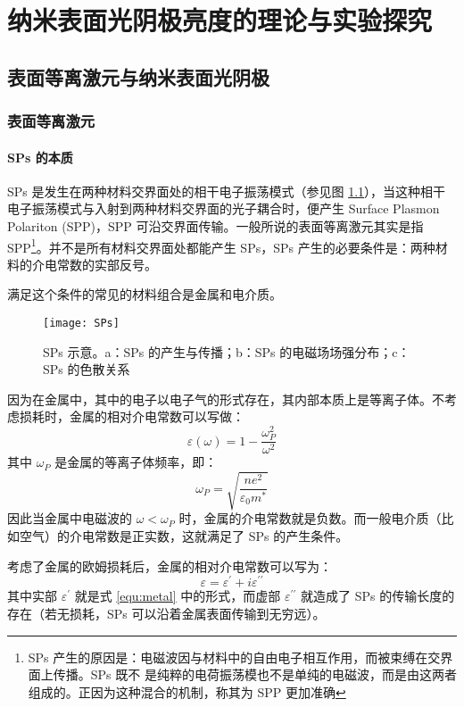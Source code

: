 \chapter{纳米表面光阴极亮度的理论与实验探究}
\label{chap:NPC}

\section{表面等离激元与纳米表面光阴极}
\subsection{表面等离激元}
\subsubsection{SPs 的本质}
SPs 是发生在两种材料交界面处的相干电子振荡模式（参见图 \ref{fig:SPs}），当这种相干电子振荡模式与入射到两种材料交界面的光子耦合时，便产生 Surface Plasmon Polariton (SPP)，SPP 可沿交界面传输。一般所说的表面等离激元其实是指 SPP\footnote{SPs 产生的原因是：电磁波因与材料中的自由电子相互作用，而被束缚在交界面上传播。SPs 既不 是纯粹的电荷振荡模也不是单纯的电磁波，而是由这两者组成的。正因为这种混合的机制，称其为 SPP 更加准确}。并不是所有材料交界面处都能产生 SPs，SPs 产生的必要条件是：两种材料的介电常数的实部反号。

满足这个条件的常见的材料组合是金属和电介质。

\begin{figure}[htbp]
\centering
\texttt{[image: SPs]}
\caption{\label{fig:SPs} SPs 示意。a：SPs 的产生与传播；b：SPs 的电磁场场强分布；c：SPs 的色散关系}
\end{figure}
	
因为在金属中，其中的电子以电子气的形式存在，其内部本质上是等离子体。不考虑损耗时，金属的相对介电常数可以写做：
\begin{equation}
\varepsilon(\omega) = 1-\dfrac{\omega_P^2}{\omega^2}
\label{equ:metal}
\end{equation}
其中 $\omega_P$ 是金属的等离子体频率，即：
\[
	\omega_P = \sqrt{\dfrac{ne^2}{\varepsilon_0m^*}}
\]
因此当金属中电磁波的 $\omega<\omega_P$ 时，金属的介电常数就是负数。而一般电介质（比如空气）的介电常数是正实数，这就满足了 SPs 的产生条件。

考虑了金属的欧姆损耗后，金属的相对介电常数可以写为：
\begin{equation}
\label{equ:e}
\varepsilon = \varepsilon^{\prime} + i\varepsilon^{\prime\prime}
\end{equation}
其中实部 $\varepsilon^{\prime}$ 就是式 \ref{equ:metal} 中的形式，而虚部 $\varepsilon^{\prime\prime}$ 就造成了 SPs 的传输长度的存在（若无损耗，SPs 可以沿着金属表面传输到无穷远）。

